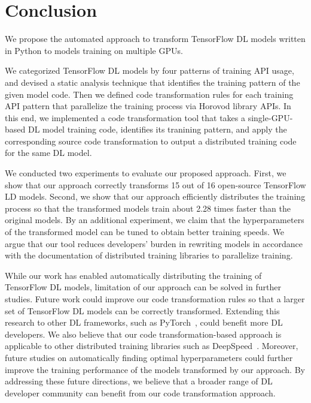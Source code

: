 \section{Conclusion}\label{sec:conclusion}
We propose the automated approach to transform TensorFlow DL models written in
Python to models training on multiple GPUs.
\begin{inred}
We categorized TensorFlow DL models by four patterns of training API usage,
and devised a static analysis technique that identifies the training pattern
of the given model code.
Then we defined code transformation rules for each training API pattern
that parallelize the training process via Horovod library APIs.
In this end, we implemented a code transformation tool
that takes a single-GPU-based DL model training code,
identifies its tranining pattern, and apply the corresponding source code
transformation to output a distributed training code for the same DL model.

We conducted two experiments to evaluate our proposed approach.
First, we show that our approach correctly transforms 15 out of 16
open-source TensorFlow LD models.
Second, we show that our approach efficiently distributes the training process
so that the transformed models train about 2.28 times faster than the original models.
By an additional experiment,
we claim that the hyperparameters of the transformed model can be tuned to
obtain better training speeds.
We argue that our tool reduces developers' burden in rewriting models
in accordance with the documentation of distributed training libraries to
parallelize training.

While our work has enabled automatically distributing the training of TensorFlow
DL models, limitation of our approach can be solved in further studies.
Future work could improve our code transformation rules so that 
a larger set of TensorFlow DL models can be correctly transformed.
Extending this research to other DL frameworks, such as PyTorch~\cite{pytorch2019},
could benefit more DL developers. 
We also believe that our code transformation-based approach is applicable
to other distributed training libraries such as DeepSpeed~\cite{deepspeed}.
Moreover, future studies on automatically finding optimal hyperparameters could
further improve the training performance of the models transformed by our approach.
By addressing these future directions,
we believe that a broader range of DL developer community can benefit from
our code transformation approach.
\end{inred}


